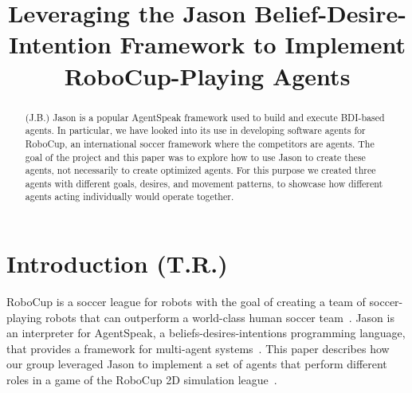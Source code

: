 \documentclass[conference]{IEEEtran}
\begin{document}
\title{Leveraging the Jason Belief-Desire-Intention Framework to Implement RoboCup-Playing Agents\\
}

\author{
\and
{}
\and
{}
\and
{}
}

\maketitle

\begin{abstract}
(J.B.) Jason is a popular AgentSpeak framework used to build and execute BDI-based agents.
In particular, we have looked into its use in developing software agents for RoboCup, an international soccer framework where the competitors are agents.
The goal of the project and this paper was to explore how to use Jason to create these agents, not necessarily to create optimized agents.
For this purpose we created three agents with different goals, desires, and movement patterns, to showcase how different agents acting individually would operate together.
\end{abstract}


\section{Introduction (T.R.)}
RoboCup is a soccer league for robots with the goal of creating a team of
soccer-playing robots that can outperform a world-class human soccer
team~\cite{robocup-objective}. Jason is an interpreter for AgentSpeak, a
beliefs-desires-intentions programming language, that provides a framework for
multi-agent systems~\cite{jason-description}. This paper describes how our
group leveraged Jason to implement a set of agents that perform different roles
in a game of the RoboCup 2D simulation league~\cite{robocup-simulation-2d}.
\end{document}
